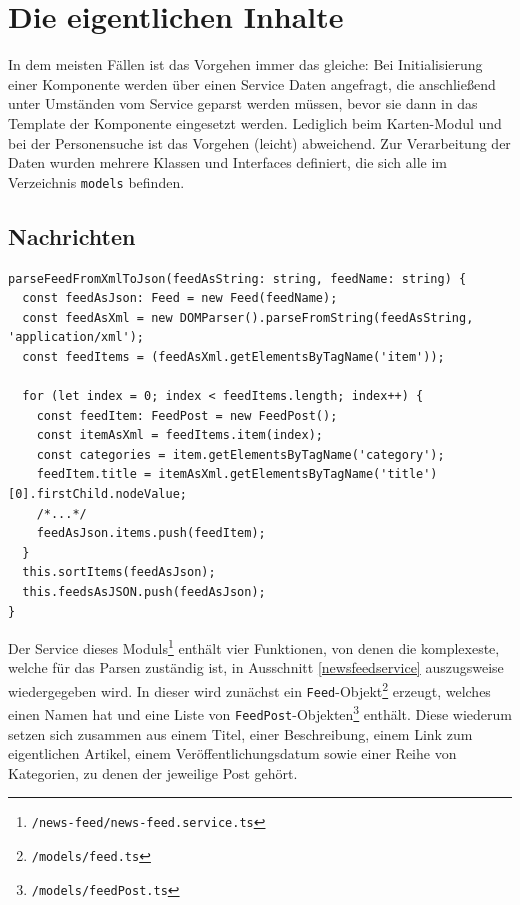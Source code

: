 \section{Die eigentlichen Inhalte}
\label{sec:prog:components}
In dem meisten Fällen ist das Vorgehen immer das gleiche: Bei Initialisierung einer Komponente werden über einen Service Daten angefragt, die anschließend unter Umständen vom Service geparst werden müssen, bevor sie dann in das Template der Komponente eingesetzt werden. Lediglich beim Karten-Modul und bei der Personensuche ist das Vorgehen (leicht) abweichend. Zur Verarbeitung der Daten wurden mehrere Klassen und Interfaces definiert, die sich alle im Verzeichnis \texttt{models} befinden.

\subsection{Nachrichten}
\label{sec:prog:news}
\begin{lstlisting}[float, floatplacement=h, style=htmlcssjs, caption={Ausschnitt aus dem NewsFeedService}, label={newsfeedservice}]
parseFeedFromXmlToJson(feedAsString: string, feedName: string) {
  const feedAsJson: Feed = new Feed(feedName);
  const feedAsXml = new DOMParser().parseFromString(feedAsString, 'application/xml');
  const feedItems = (feedAsXml.getElementsByTagName('item'));

  for (let index = 0; index < feedItems.length; index++) {
    const feedItem: FeedPost = new FeedPost();
    const itemAsXml = feedItems.item(index);
    const categories = item.getElementsByTagName('category');
    feedItem.title = itemAsXml.getElementsByTagName('title')[0].firstChild.nodeValue;
    /*...*/
    feedAsJson.items.push(feedItem);
  }
  this.sortItems(feedAsJson);
  this.feedsAsJSON.push(feedAsJson);
}
\end{lstlisting}
Der Service dieses Moduls\footnote{\texttt{/news-feed/news-feed.service.ts}} enthält vier Funktionen, von denen die komplexeste, welche für das Parsen zuständig ist, in Ausschnitt \ref{newsfeedservice} auszugsweise wiedergegeben wird. In dieser wird zunächst ein \texttt{Feed}-Objekt\footnote{\texttt{/models/feed.ts}} erzeugt, welches einen Namen hat und eine Liste von \texttt{FeedPost}-Objekten\footnote{\texttt{/models/feedPost.ts}} enthält. Diese wiederum setzen sich zusammen aus einem Titel, einer Beschreibung, einem Link zum eigentlichen Artikel, einem Veröffentlichungsdatum sowie einer Reihe von Kategorien, zu denen der jeweilige Post gehört.


